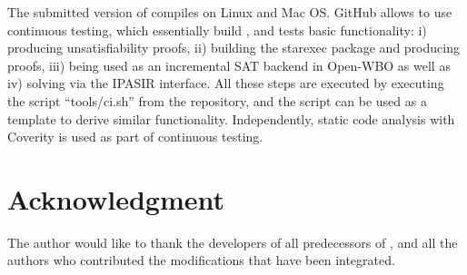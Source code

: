 \documentclass[conference]{IEEEtran}
\begin{document}
The submitted version of \mergesat compiles on Linux and Mac OS.
GitHub allows to use continuous testing, which essentially build \mergesat, and tests basic functionality:
i) producing unsatisfiability proofs, ii) building the starexec package and producing proofs, iii) being used as an incremental SAT backend in Open-WBO as well as  iv) solving via the IPASIR interface.
All these steps are executed by executing the script ``tools/ci.sh'' from the repository, and the script can be used as a template to derive similar functionality.
Independently, static code analysis with Coverity is used as part of continuous testing.

\section*{Acknowledgment}

The author would like to thank the developers of all predecessors of \mergesat, and all the authors who contributed the modifications that have been integrated.



\end{document}
